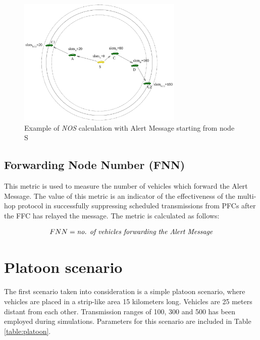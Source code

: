 			\begin{figure}[H]
				\centering
				\includegraphics[width=0.7\textwidth]{immagini/slots}
				\caption{Example of \textit{NOS} calculation with Alert Message starting from node S}
				\label{fig:slots}
			\end{figure}
			
			
		\subsection{Forwarding Node Number (FNN)}
			This metric is used to measure the number of vehicles which forward the Alert Message. The value of this metric is an indicator of the effectiveness of the multi-hop protocol in successfully suppressing scheduled transmissions from PFCs after the FFC has relayed the message. The metric is calculated as follows:
			 
			\begin{gather}
				\label{eq:nos}
				FNN = \textrm{\textit{no. of vehicles forwarding the Alert Message}}
			\end{gather}	
				
	\section{Platoon scenario}
		The first scenario taken into consideration is a simple platoon scenario, where vehicles are placed in a strip-like area 15 kilometers long. Vehicles are 25 meters distant from each other. Transmission ranges of 100, 300 and 500 has been employed during simulations. 
		Parameters for this scenario are included in Table \ref{table:platoon}.  
		
